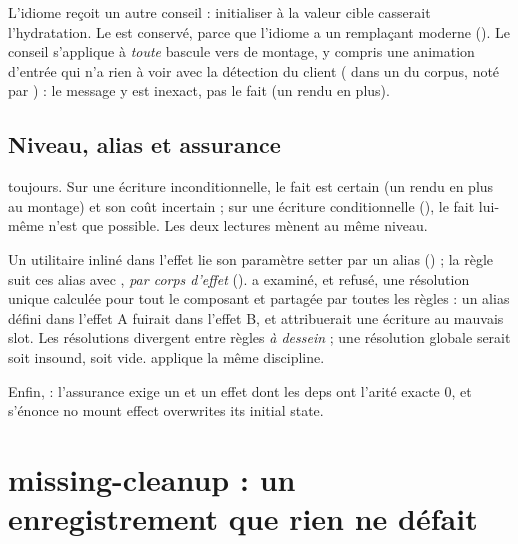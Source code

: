 
L'idiome reçoit un autre conseil : \og initialiser à la valeur cible\fg{} casserait l'hydratation. Le \Warning{} est conservé, parce que l'idiome a un remplaçant moderne (). Le conseil s'applique à \emph{toute} bascule  vers  de montage, y compris une animation d'entrée qui n'a rien à voir avec la détection du client ( dans un  du corpus, noté par ) : le message y est inexact, pas le fait (un rendu en plus).

\subsection{Niveau, alias et assurance}

\Warning{} toujours. Sur une écriture inconditionnelle, le fait est certain (un rendu en plus au montage) et son coût incertain ; sur une écriture conditionnelle (), le fait lui-même n'est que possible. Les deux lectures mènent au même niveau.

\begin{decision}
Un utilitaire inliné dans l'effet lie son paramètre setter par un alias () ; la règle suit ces alias avec , \emph{par corps d'effet} ().  a examiné, et refusé, une résolution unique calculée pour tout le composant et partagée par toutes les règles : un alias défini dans l'effet A fuirait dans l'effet B, et attribuerait une écriture au mauvais slot. Les résolutions divergent entre règles \emph{à dessein} ; une résolution globale serait soit insound, soit vide.  applique la même discipline.
\end{decision}

Enfin,  : l'assurance exige un  et un effet dont les deps ont l'arité exacte 0, et s'énonce \og no mount effect overwrites its initial state\fg{}.


\section{missing-cleanup : un enregistrement que rien ne défait}
\label{sec:regles-effets-missing-cleanup}

